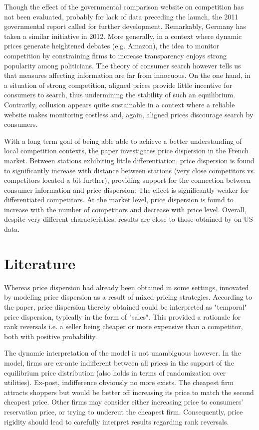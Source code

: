 \documentclass[11pt]{article}
\begin{document}
Though the effect of the governmental comparison website on competition has not been evaluated, probably for lack of data preceding the launch, the 2011 governmental report called for further development. Remarkably, Germany has taken a similar initiative in 2012. More generally, in a context where dynamic prices generate heightened debates (e.g. Amazon), the idea to monitor competition by constraining firms to increase transparency enjoys strong popularity among politicians. The theory of consumer search however tells us that measures affecting information are far from innocuous. On the one hand, in a situation of strong competition, aligned prices provide little incentive for consumers to search, thus undermining the stability of such an equilibrium. Contrarily, collusion appears quite sustainable in a context where a reliable website makes monitoring costless and, again, aligned prices discourage search by consumers.

With a long term goal of being able able to achieve a better understanding of local competition contexts, the paper investigates price dispersion in the French market. Between stations exhibiting little differentiation, price dispersion is found to significantly increase with distance between stations (very close competitors vs. competitors located a bit further), providing support for the connection between consumer information and price dispersion. The effect is significantly weaker for differentiated competitors. At the market level, price dispersion is found to increase with the number of competitors and decrease with price level. Overall, despite very different characteristics, results are close to those obtained by \cite{TAP11} on US data.

\section{Literature}

Whereas price dispersion had already been obtained in some settings, \cite{VAR80} innovated by modeling price dispersion as a result of mixed pricing strategies. According to the paper, price dispersion thereby obtained could be interpreted as "temporal" price dispersion, typically in the form of "sales". This provided a rationale for rank reversals i.e. a seller being cheaper or more expensive than a competitor, both with positive probability.

The dynamic interpretation of the model is not unambiguous however. In the model, firms are ex-ante indifferent between all prices in the support of the equilibrium price distribution (also holds in terms of randomization over utilities). Ex-post, indifference obviously no more exists. The cheapest firm attracts shoppers but would be better off increasing its price to match the second cheapest price. Other firms may consider either increasing price to consumers' reservation price, or trying to undercut the cheapest firm. Consequently, price rigidity should lead to carefully interpret results regarding rank reversals.
\end{document}
